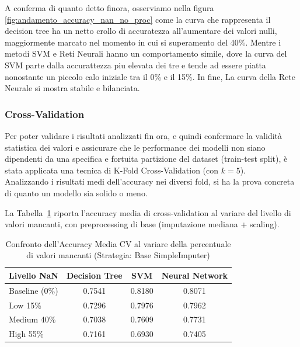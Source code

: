 \documentclass[12pt]{article}
\begin{document}
A conferma di quanto detto finora, osserviamo nella figura \ref{fig:andamento_accuracy_nan_no_proc} come la curva che rappresenta il decision tree ha un netto crollo di accuratezza all'aumentare dei valori nulli, maggiormente marcato nel momento in cui si superamento del 40\%. Mentre i metodi SVM e Reti Neurali hanno un comportamento simile, dove la curva del SVM parte dalla accurattezza piu elevata dei tre e tende ad essere piatta nonostante un piccolo calo iniziale tra il 0\% e il 15\%. In fine, La curva della Rete Neurale si mostra stabile e bilanciata.

\subsubsection{Cross-Validation}
Per poter validare i risultati analizzati fin ora, e quindi confermare la validità statistica dei valori e assicurare che le performance dei modelli non siano dipendenti da una specifica e fortuita partizione del dataset (train-test split), è stata applicata una tecnica di K-Fold Cross-Validation (con $k=5$).\\

 Analizzando i risultati medi dell'accuracy nei diversi fold, si ha la prova concreta di quanto un modello sia solido o meno.

La Tabella~\ref{tab:confronto_modelli_nan} riporta l'accuracy media di cross-validation al variare del livello di valori mancanti, con preprocessing di base (imputazione mediana + scaling).

\begin{table}[H]
    \centering
    \begin{tabular}{lccc}
        \toprule
        \textbf{Livello NaN} & \textbf{Decision Tree} & \textbf{SVM} & \textbf{Neural Network} \\
        \midrule
        Baseline (0\%) & 0.7541 & 0.8180 & 0.8071 \\
        Low 15\%       & 0.7296 & 0.7976 & 0.7962 \\
        Medium 40\%    & 0.7038 & 0.7609 & 0.7731 \\
        High 55\%      & 0.7161 & 0.6930 & 0.7405 \\
        \bottomrule
    \end{tabular}
    \caption{Confronto dell'Accuracy Media CV al variare della percentuale di valori mancanti (Strategia: Base SimpleImputer)}
    \label{tab:confronto_modelli_nan}
\end{table}
\end{document}
